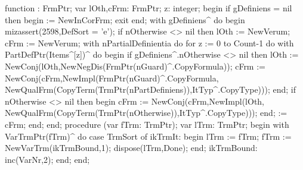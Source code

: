 function : FrmPtr;
var
   lOth,cFrm: FrmPtr;
   z: integer;
begin
   if gDefiniens = nil then
   begin  := NewInCorFrm; exit end;
   with gDefiniens^ do
   begin
      mizassert(2598,DefSort = 'e');
      if nOtherwise <> nil then lOth := NewVerum;
      cFrm := NewVerum;
      with nPartialDefinientia do
         for z := 0 to Count-1 do
            with PartDefPtr(Items^[z])^ do
         begin
            if gDefiniens^.nOtherwise <> nil then
               lOth := NewConj(lOth,NewNegDis(FrmPtr(nGuard)^.CopyFormula));
            cFrm := NewConj(cFrm,NewImpl(FrmPtr(nGuard)^.CopyFormula,
                                         NewQualFrm(CopyTerm(TrmPtr(nPartDefiniens)),ItTyp^.CopyType)));
         end;
      if nOtherwise <> nil then
      begin
         cFrm := NewConj(cFrm,NewImpl(lOth,
                                      NewQualFrm(CopyTerm(TrmPtr(nOtherwise)),ItTyp^.CopyType)));
      end;
       := cFrm;
  end;
end;
\eatline
{}\nwendcode{}\nwdocspar
\nwenddocs{}\endmoddef\nwstartdeflinemarkup{}\nwenddeflinemarkup
procedure (var fTrm: TrmPtr);
var
   lTrm: TrmPtr;
begin
  with VarTrmPtr(fTrm)^ do
     case TrmSort of
        ikTrmIt:
           begin
              lTrm := fTrm;
              fTrm := NewVarTrm(ikTrmBound,1);
              dispose(lTrm,Done);
           end;
        ikTrmBound:
           inc(VarNr,2);
     end;
end;
\eatline
{}\nwendcode{}\nwdocspar
